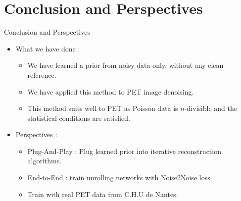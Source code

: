 \documentclass{beamer}
\numberwithin{proposition}{section}
\begin{document}
\section{Conclusion and Perspectives}

\begin{frame}
\end{frame}

\begin{frame}{Conclusion and Perspectives}
    \begin{itemize}
        \item What we have done :
        \begin{itemize}
            \item We have learned a prior from noisy data only, without any clean reference.
            \item We have applied this method to PET image denoising.
            \item This method suits well to PET as Poisson data is $n$-divisible and the statistical conditions are satisfied.
        \end{itemize}
        \item Perspectives :
        \begin{itemize}
            \item Plug-And-Play : Plug learned prior into iterative reconstruction algorithms.
            \item End-to-End : train unrolling networks with Noise2Noise loss.
            \item Train with real PET data from C.H.U de Nantes.
        \end{itemize}
    \end{itemize}
\end{frame}
\end{document}
